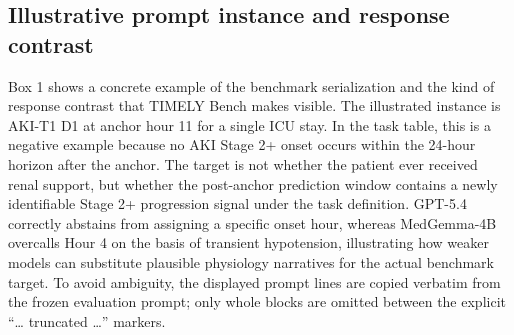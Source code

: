 \documentclass[pdflatex,sn-nature]{sn-jnl}
\begin{document}


\subsection{Illustrative prompt instance and response contrast}

Box 1 shows a concrete example of the benchmark serialization and the kind of response contrast that TIMELY Bench makes visible. The illustrated instance is AKI-T1 D1 at anchor hour 11 for a single ICU stay. In the task table, this is a negative example because no AKI Stage 2+ onset occurs within the 24-hour horizon after the anchor. The target is not whether the patient ever received renal support, but whether the post-anchor prediction window contains a newly identifiable Stage 2+ progression signal under the task definition. GPT-5.4 correctly abstains from assigning a specific onset hour, whereas MedGemma-4B overcalls Hour 4 on the basis of transient hypotension, illustrating how weaker models can substitute plausible physiology narratives for the actual benchmark target. To avoid ambiguity, the displayed prompt lines are copied verbatim from the frozen evaluation prompt; only whole blocks are omitted between the explicit ``\ldots{} truncated \ldots{}'' markers.
\end{document}
